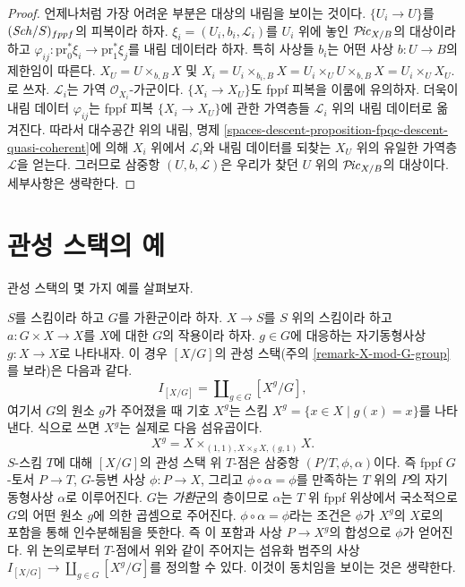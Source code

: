 \begin{proof}
언제나처럼 가장 어려운 부분은 대상의 내림을 보이는 것이다.
$\{U_i \to U\}$를 $(\mathit{Sch}/S)_{fppf}$의 피복이라 하자.
$\xi_i = (U_i, b_i, \mathcal{L}_i)$를 $U_i$ 위에 놓인
$\mathcal{P}\!\mathit{ic}_{X/B}$의 대상이라 하고
$\varphi_{ij} : \text{pr}_0^*\xi_i \to \text{pr}_1^*\xi_j$를 내림 데이터라
하자. 특히 사상들 $b_i$는 어떤 사상 $b : U \to B$의 제한임이 따른다.
$X_U = U \times_{b, B} X$ 및
$X_i = U_i \times_{b_i, B} X =
U_i \times_U U \times_{b, B} X = U_i \times_U X_U$.
로 쓰자. $\mathcal{L}_i$는 가역 $\mathcal{O}_{X_i}$-가군이다.
$\{X_i \to X_U\}$도 fppf 피복을 이룸에 유의하자. 더욱이 내림 데이터
$\varphi_{ij}$는 fppf 피복 $\{X_i \to X_U\}$에 관한 가역층들
$\mathcal{L}_i$ 위의 내림 데이터로 옮겨진다. 따라서 대수공간 위의 내림,
명제 \ref{spaces-descent-proposition-fpqc-descent-quasi-coherent}에 의해
$X_i$ 위에서 $\mathcal{L}_i$와 내림 데이터를 되찾는 $X_U$ 위의 유일한
가역층 $\mathcal{L}$을 얻는다. 그러므로 삼중항 $(U, b, \mathcal{L})$은
우리가 찾던 $U$ 위의 $\mathcal{P}\!\mathit{ic}_{X/B}$의 대상이다. 세부사항은 생략한다.
\end{proof}





\section{관성 스택의 예}
\label{section-examples-inertia}

\noindent
관성 스택의 몇 가지 예를 살펴보자.

\begin{example}
\label{example-inertia-stack-of-X-mod-G}
$S$를 스킴이라 하고 $G$를 가환군이라 하자. $X \to S$를 $S$ 위의 스킴이라
하고 $a : G \times X \to X$를 $X$에 대한 $G$의 작용이라 하자.
$g \in G$에 대응하는 자기동형사상 $g : X \to X$로 나타내자.
이 경우 $[X/G]$의 관성 스택(주의 \ref{remark-X-mod-G-group}를 보라)은
다음과 같다.
$$
I_{[X/G]} = \coprod\nolimits_{g\in G} [X^g/G],
$$
여기서 $G$의 원소 $g$가 주어졌을 때 기호 $X^g$는 스킴
$X^g = \{x \in X \mid g(x) = x\}$를 나타낸다. 식으로 쓰면 $X^g$는 실제로
다음 섬유곱이다.
$$
X^g =  X \times_{(1, 1), X \times_S X, (g, 1)} X.
$$
$S$-스킴 $T$에 대해 $[X/G]$의 관성 스택 위 $T$-점은 삼중항
$(P/T, \phi, \alpha)$이다. 즉 fppf $G$-토서 $P \to T$, $G$-등변 사상
$\phi : P \to X$, 그리고 $\phi \circ \alpha = \phi$를 만족하는 $T$ 위의
$P$의 자기동형사상 $\alpha$로 이루어진다. $G$는 \emph{가환}군의 층이므로
$\alpha$는 $T$ 위 fppf 위상에서 국소적으로 $G$의 어떤 원소 $g$에 의한
곱셈으로 주어진다. $\phi \circ \alpha = \phi$라는 조건은 $\phi$가
$X^g$의 $X$로의 포함을 통해 인수분해됨을 뜻한다. 즉 이 포함과 사상
$P \to X^g$의 합성으로 $\phi$가 얻어진다. 위 논의로부터
$T$-점에서 위와 같이 주어지는 섬유화 범주의 사상
$I_{[X/G]} \to \coprod_{g\in G} [X^g/G]$를 정의할 수 있다. 이것이
동치임을 보이는 것은 생략한다.
\end{example}

